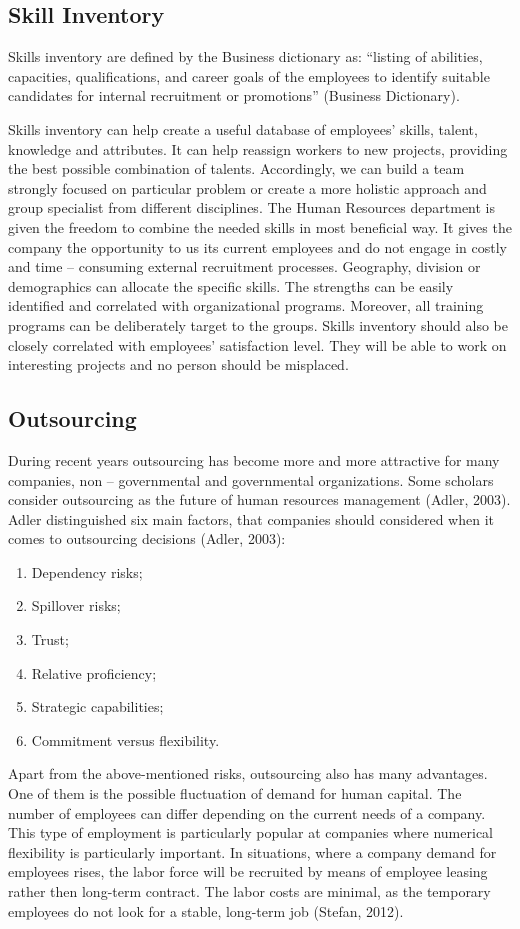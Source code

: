 \documentclass[a4paper,fleqn,11pt,dvips,titlepage]{article}
\numberwithin{figure}{section}
\numberwithin{equation}{section}
\begin{document}
\subsection{Skill Inventory}

Skills inventory are defined by the Business dictionary as:
“listing of abilities, capacities, qualifications, and career goals of the employees to identify suitable candidates for internal recruitment or promotions” (Business Dictionary).

Skills inventory can help create a useful database of employees’ skills, talent, knowledge and attributes.
It can help reassign workers to new projects, providing the best possible combination of talents.
Accordingly, we can build a team strongly focused on particular problem or create a more holistic approach and group specialist from different disciplines.
The Human Resources department is given the freedom to combine the needed skills in most beneficial way.
It gives the company the opportunity to us its current employees and do not engage in costly and time – consuming external recruitment processes.
Geography, division or demographics can allocate the specific skills.
The strengths can be easily identified and correlated with organizational programs.
Moreover, all training programs can be deliberately target to the groups.
Skills inventory should also be closely correlated with employees’ satisfaction level.
They will be able to work on interesting projects and no person should be misplaced. 

\subsection{Outsourcing }

During recent years outsourcing has become more and more attractive for many companies, non – governmental and governmental organizations.
Some scholars consider outsourcing as the future of human resources management (Adler, 2003).
Adler distinguished six main factors, that companies should considered when it comes to outsourcing decisions (Adler, 2003):
\begin{enumerate}
  \item Dependency risks;
  \item Spillover risks;
  \item Trust;
  \item Relative proficiency;
  \item Strategic capabilities;
  \item Commitment versus flexibility.
\end{enumerate}
Apart from the above-mentioned risks, outsourcing also has many advantages.
One of them is the possible fluctuation of demand for human capital.
The number of employees can differ depending on the current needs of a company.
This type of employment is particularly popular at companies where numerical flexibility is particularly important.
In situations, where a company demand for employees rises, the labor force will be recruited by means of employee leasing rather then long-term contract.
The labor costs are minimal, as the temporary employees do not look for a stable, long-term job (Stefan, 2012). 
\end{document}
